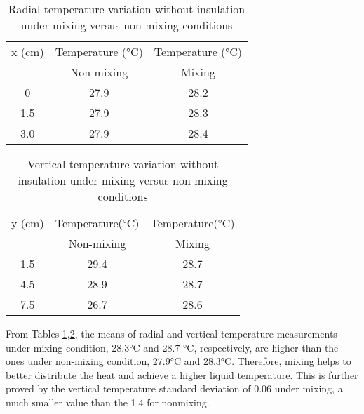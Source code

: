 \begin{table}[]
    \centering
    \begin{tabular}{ccc}
    \toprule
    x (cm) & Temperature (\si{\celsius}) & Temperature (\si{\celsius})\\
    & Non-mixing & Mixing \\
    \midrule
    0 & 27.9 & 28.2\\
    1.5 & 27.9 & 28.3\\
    3.0 & 27.9 & 28.4\\
    \bottomrule
    \end{tabular}
    \caption{Radial temperature variation without insulation under mixing versus non-mixing conditions}
    \label{tb:RadialTempVariation}
\end{table}
\begin{table}
    \centering
    \begin{tabular}{ccc}
    \toprule
    y (cm) & Temperature(\si{\celsius}) & Temperature(\si{\celsius})\\
    & Non-mixing & Mixing \\
    \midrule
    1.5 & 29.4 & 28.7 \\
    4.5 & 28.9 & 28.7 \\
    7.5 & 26.7 & 28.6 \\
    \bottomrule
    \end{tabular}
    \caption{Vertical temperature variation without insulation under mixing versus non-mixing conditions}
    \label{tb:VerticalTempVariation}
\end{table}

From Tables \ref{tb:RadialTempVariation},\ref{tb:VerticalTempVariation}, the means of radial and vertical temperature measurements under mixing condition, 28.3\si{\celsius} and 28.7 \si{\celsius}, respectively, are higher than the ones under non-mixing condition, 27.9\si{\celsius} and 28.3\si{\celsius}. Therefore, mixing helps to better distribute the heat and achieve a higher liquid temperature. This is further proved by the vertical temperature standard deviation of 0.06 under mixing, a much smaller value than the 1.4 for nonmixing. 


